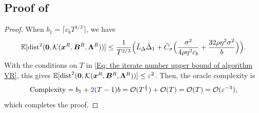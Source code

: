 \subsection{Proof of }
\label{app:storm-oracle-proof}
\begin{proof}
    When $b_1=\lceil c_bT^{1/3}\rceil$, we have
    \[
        \mathbb{E}[\mathrm{dist}^{2}(\bm{0}, \mathcal K(\bm{x}^{R}, \bm{B}^{R}, \bm{\Lambda}^{R}))]\le\frac{1}{T^{2/3}}\Bigl(\tilde{L}_{\Delta}\tilde{\Delta}_{1}+\tilde{C}_{\sigma}\Bigl(\frac{\sigma^{2}}{4\rho\eta^{2}c_b}+\frac{32\rho\eta^{2}\sigma^{2}}{b}\Bigr)\Bigr).
    \]
    With the conditions on $T$ in \eqref{Eq: the iterate number upper bound of algorithm VR}, this gives $\mathbb{E}[\mathrm{dist}^{2}(\bm{0}, \mathcal K(\bm{x}^{R}, \bm{B}^{R}, \bm{\Lambda}^{R}))]\le\varepsilon^2$. Then, the oracle complexity is
    \[
        \text{Complexity}= b_{1}+ {\color{blue}2}(T-1)b = \mathcal{O}(T^{\frac{1}{3}}) + \mathcal{O}(T) = \mathcal{O}(T) = \mathcal{O}(\varepsilon^{-3}),
    \]
    which completes the proof.
\end{proof}


